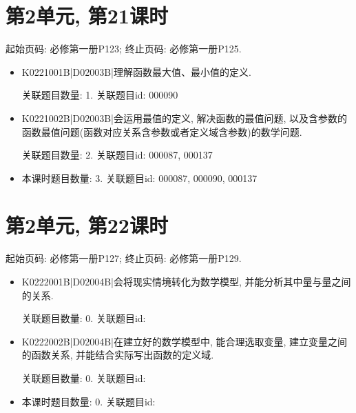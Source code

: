 \section*{第2单元, 第21课时}
起始页码: 必修第一册P123; 终止页码: 必修第一册P125.
\begin{itemize}
\item K0221001B|D02003B|理解函数最大值、最小值的定义.

关联题目数量: 1. 关联题目id: 000090

\item K0221002B|D02003B|会运用最值的定义, 解决函数的最值问题, 以及含参数的函数最值问题(函数对应关系含参数或者定义域含参数)的数学问题.

关联题目数量: 2. 关联题目id: 000087, 000137

\item 本课时题目数量: 3. 关联题目id: 000087, 000090, 000137

\end{itemize}

\section*{第2单元, 第22课时}
起始页码: 必修第一册P127; 终止页码: 必修第一册P129.
\begin{itemize}
\item K0222001B|D02004B|会将现实情境转化为数学模型, 并能分析其中量与量之间的关系.

关联题目数量: 0. 关联题目id: 

\item K0222002B|D02004B|在建立好的数学模型中, 能合理选取变量, 建立变量之间的函数关系, 并能结合实际写出函数的定义域.

关联题目数量: 0. 关联题目id: 

\item 本课时题目数量: 0. 关联题目id: 

\end{itemize}

